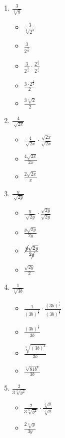 \documentclass{article}
\begin{document}
\begin{onehalfspace}
\begin{enumerate}[start=59]
        \item $\frac{3}{\sqrt[4]{8}}$
        \begin{itemize}
            \item $\frac{3}{\sqrt[4]{2^{3}}}$
            \item $\frac{3}{2^{\frac{3}{4}}}$
            \item $\frac{3}{2^{\frac{3}{4}}} \cdot \frac{2^{\frac{1}{4}}}{2^{\frac{1}{4}}}$
            \item $\frac{3 \cdot 2^{\frac{1}{4}}}{2}$
            \item $\frac{3 \sqrt[4]{2}}{2}$
        \end{itemize}

        \item $\frac{4}{\sqrt[]{2x}}$
        \begin{itemize}
            \item $\frac{4}{\sqrt[]{2x}} \cdot \frac{\sqrt{2x}}{\sqrt{2x}}$
            \item $\frac{4 \sqrt{2x}}{2x}$
            \item $\frac{2 \sqrt{2x}}{x}$
        \end{itemize}

        \item $\frac{y}{\sqrt[]{2y}}$
        \begin{itemize}
            \item $\frac{y}{\sqrt[]{2y}} \cdot \frac{\sqrt{2y}}{\sqrt{2y}}$
            \item $\frac{y\sqrt{2y}}{2y}$
            \item $\frac{\cancel{y} \sqrt{2y}}{2\cancel{y}}$
            \item $\frac{\sqrt{2y}}{2}$
        \end{itemize}

        \item $\frac{1}{\sqrt[5]{3b}}$
        \begin{itemize}
            \item $\frac{1}{(3b)^{\frac{1}{5}}} \cdot \frac{(3b)^{\frac{4}{5}}}{(3b)^{\frac{4}{5}}}$
            \item $\frac{(3b)^{\frac{4}{5}}}{3b}$
            \item $\frac{\sqrt[5]{(3b)^{4}}}{3b}$
            \item $\frac{\sqrt[5]{81b^{4}}}{3b}$
        \end{itemize}

        \item $\frac{2}{3\sqrt[3]{y^{2}}}$
        \begin{itemize}
            \item $\frac{2}{3\sqrt[3]{y^{2}}} \cdot \frac{\sqrt[3]{y}}{\sqrt[3]{y}}$
            \item $\frac{2\sqrt[3]{y}}{3y}$
        \end{itemize}


\end{enumerate}
\end{onehalfspace}
\end{document}
